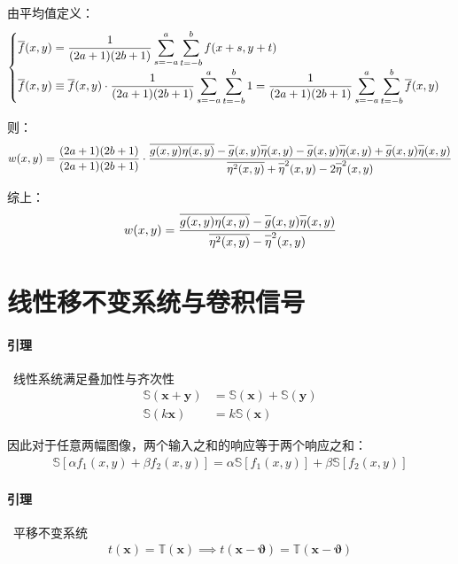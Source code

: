 \documentclass{article}
\newcommand{\barline}[1]{\overline{#1\rule{0pt}{1.5ex}}}
\begin{document}
由平均值定义：
\begin{align*}
    \begin{cases}
        \barline{f}(x,y)=\dfrac{1}{(2a+1)(2b+1)}\displaystyle\sum_{s=-a}^{a}\sum_{t=-b}^{b}f(x+s,y+t)
        \\[10pt]
        \barline{f}(x,y)\equiv\barline{f}(x,y)\cdot\dfrac{1}{(2a+1)(2b+1)}\displaystyle\sum_{s=-a}^{a}\sum_{t=-b}^{b}1=\dfrac{1}{(2a+1)(2b+1)}\displaystyle\sum_{s=-a}^{a}\sum_{t=-b}^{b}\barline{f}(x,y)
    \end{cases}
\end{align*}

则：
\begin{align*}
    w(x,y)=\dfrac{(2a+1)(2b+1)}{(2a+1)(2b+1)}\cdot\dfrac{\barline{g(x,y)\eta(x,y)}-\barline{g}(x,y)\barline{\eta}(x,y)-\barline{g}(x,y)\barline{\eta}(x,y)+\barline{g}(x,y)\barline{\eta}(x,y)}{\barline{\eta^2(x,y)}+\barline{\eta}^2(x,y)-2\barline{\eta}^2(x,y)}
\end{align*}

综上：
\begin{align*}
    w(x,y)=\dfrac{\barline{g(x,y)\eta(x,y)}-\barline{g}(x,y)\barline{\eta}(x,y)}{\barline{\eta^2(x,y)}-\barline{\eta}^2(x,y)}
\end{align*}



\section{线性移不变系统与卷积信号}
\paragraph*{引理}~{线性系统满足叠加性与齐次性}
\begin{align*}
    \mathbb{S}(\bm{x}+\bm{y})&=\mathbb{S}(\bm{x})+\mathbb{S}(\bm{y})
    \\
    \mathbb{S}(k\bm{x})&=k\mathbb{S}(\bm{x})
\end{align*}

因此对于任意两幅图像，两个输入之和的响应等于两个响应之和：
\begin{align*}
    \mathbb{S}\left[\alpha f_1(x,y)+\beta f_2(x,y)\right]=\alpha\mathbb{S}[f_1(x,y)]+\beta\mathbb{S}[f_2(x,y)]
\end{align*}

\paragraph*{引理}~{平移不变系统}
\begin{align*}
    t(\bm{x})=\mathbb{T}(\bm{x})\implies t(\bm{x}-\bm{\vartheta})=\mathbb{T}(\bm{x}-\bm{\vartheta})
\end{align*}
\end{document}
